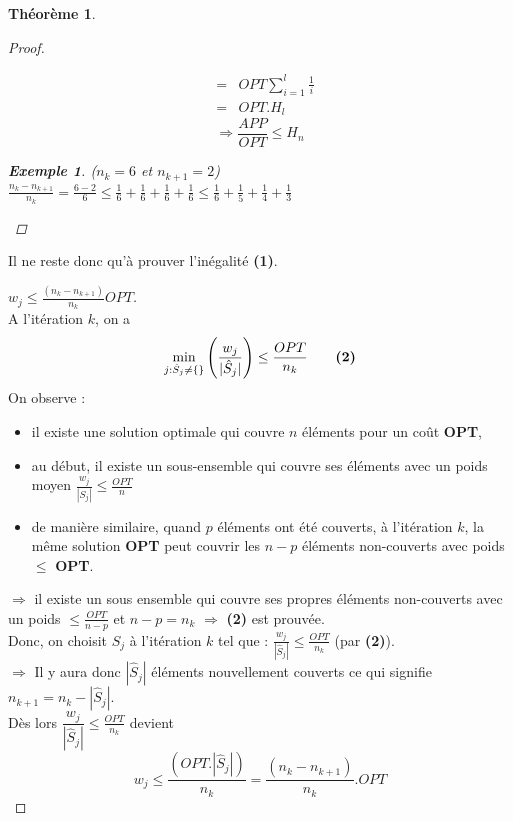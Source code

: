 \documentclass{article}
\newtheorem{exemple}{Exemple}[section]
\newtheorem{thm}{Th\'eor\`eme}[section]
\newtheorem{proof}{Preuve}[section]
\begin{document}
\begin{sffamily}
\begin{thm}
\begin{proof}
\begin{itemize}
$$\begin{eqnarray}
	& = & OPT \sum_{i=1}^l \frac{1}{i} \\
	& = & OPT.H_l
\end{eqnarray}$$ $$\Rightarrow \frac{APP}{OPT} \leq H_n$$
\begin{exemple}($n_k=6$ et $n_{k+1}=2$) \\
$\frac{n_k - n_{k+1}}{n_k}=\frac{6-2} 6 \leq \frac 1 6 +\frac 1 6 +\frac 1 6 +\frac 1 6 \leq \frac 1 6 +\frac 1 5 +\frac 1 4 +\frac 1 3$
\end{exemple}
\end{itemize}
\end{proof}
\end{thm}

Il ne reste donc qu'à prouver l'inégalité \textbf{(1)}. \\

\newpage

\begin{proof}[$w_j \leq \frac{(n_k - n_{k+1})}{n_k}OPT$]$ $\\
A l'itération $k$, on a
$$ \min_{j:\hat{S}_j \neq \{\}} \left(\frac{w_j}{|\hat{S}_j|}\right) \leq \frac{OPT}{n_k}\qquad \text{\textbf{(2)}}$$
On observe :
\begin{itemize}
\item il existe une solution optimale qui couvre $n$ éléments pour un coût \textbf{OPT},
\item au début, il existe un sous-ensemble qui couvre ses éléments avec un poids moyen $\frac{w_j}{|S_j|} \leq \frac{OPT}{n}$
\item de manière similaire, quand $p$ éléments ont été couverts, à l'itération $k$, la même solution \textbf{OPT} peut couvrir les
$n-p$ éléments non-couverts avec poids $\leq$ \textbf{OPT}.
\end{itemize}
$\Rightarrow$ il existe un sous ensemble qui couvre ses propres éléments non-couverts avec un poids $\leq \frac{OPT}{n-p}$ et $n-p =
n_k$ $\Rightarrow$ \textbf{(2)} est prouvée. \\

\noindent Donc, on choisit $S_j$ à l'itération $k$ tel que : $\frac{w_j}{|\hat{S}_j|} \leq \frac{OPT}{n_k}$ (par \textbf{(2)}).\\
$\Longrightarrow$ Il y aura donc $|\hat{S}_j|$ éléments nouvellement couverts ce qui signifie $n_{k+1} = n_k-|\hat{S}_j| $. \\
Dès lors $\dfrac{w_j}{|\hat{S}_j|} \leq \frac{OPT}{n_k}$ devient
$$w_j \leq \frac{(OPT.|\hat{S}_j|)}{n_k} = \frac{(n_k-n_{k+1})}{n_k}.OPT$$


\end{proof}
\end{sffamily}
\end{document}
